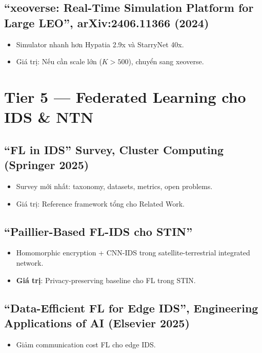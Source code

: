 \documentclass[11pt,a4paper]{article}
\begin{document}
\subsection{``xeoverse: Real-Time Simulation Platform for Large LEO'', arXiv:2406.11366 (2024)}
\begin{itemize}
  \item Simulator nhanh hơn Hypatia 2.9x và StarryNet 40x.
  \item Giá trị: Nếu cần scale lớn ($K > 500$), chuyển sang xeoverse.
\end{itemize}

\section{Tier 5 --- Federated Learning cho IDS \& NTN}

\subsection{``FL in IDS'' Survey, Cluster Computing (Springer 2025)}
\begin{itemize}
  \item Survey mới nhất: taxonomy, datasets, metrics, open problems.
  \item Giá trị: Reference framework tổng cho Related Work.
\end{itemize}

\subsection{``Paillier-Based FL-IDS cho STIN''}
\begin{itemize}
  \item Homomorphic encryption + CNN-IDS trong satellite-terrestrial integrated network.
  \item \textbf{Giá trị}: Privacy-preserving baseline cho FL trong STIN.
\end{itemize}

\subsection{``Data-Efficient FL for Edge IDS'', Engineering Applications of AI (Elsevier 2025)}
\begin{itemize}
  \item Giảm communication cost FL cho edge IDS.
\end{itemize}
\end{document}

